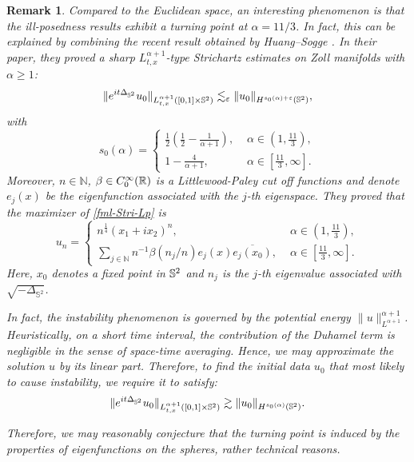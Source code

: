 \documentclass[10pt,a4paper]{amsart}
\numberwithin{equation}{section}
\newcommand{\R}{\Bbb R}
\newtheorem{remark}[theorem]{Remark}
\begin{document}
\begin{remark}
Compared to the Euclidean space, an interesting phenomenon is that the ill-posedness results exhibit a turning point at $\alpha=11/3$. In fact, this can be explained by combining the recent result obtained by Huang–Sogge \cite{Huang}. In their paper, they proved a sharp $L^{\alpha+1}_{t,x}$-type Strichartz estimates on Zoll manifolds with $\alpha \ge 1$:
\begin{equation}\label{fml-Stri-Lp}
\|e^{it\Delta_{\Bbb S^2}}u_0\|_{L^{\alpha+1}_{t,x}([0,1]\times \Bbb S^2)} \lesssim_\varepsilon
\|u_0\|_{H^{s_0(\alpha)+\varepsilon}(\Bbb S^2)},
\end{equation}
with
\begin{equation*}
s_0(\alpha)=\begin{cases}
\frac{1}{2}(\frac{1}{2}-\frac{1}{\alpha+1}),\,\, &\alpha\in(1,\frac{11}{3}),\\
1-\frac{4}{\alpha+1},\,\, &\alpha\in[\frac{11}{3},\infty].
\end{cases}
\end{equation*}
Moreover, $n\in \mathbb{N}$, $\beta\in C^\infty_0(\R)$ is a Littlewood-Paley cut off functions and denote $e_j(x)$ be the eigenfunction associated with the $j$-th eigenspace. They proved that the maximizer of \eqref{fml-Stri-Lp} is
\begin{equation*}
u_n=\begin{cases}
n^{\frac{1}{4}}(x_1+ix_2)^n,\,\, &\alpha\in(1,\frac{11}{3}),\\
\sum\limits_{j\in\mathbb{N}}n^{-1}\beta(n_j/n)e_j(x)\overline{e_j(x_0)},\,\,&\alpha\in[\frac{11}3{,\infty}].
\end{cases}
\end{equation*}
Here, $x_0$ denotes a fixed point in $\Bbb S^2$ and $n_j$ is the $j$-th eigenvalue associated with $\sqrt{-\Delta_{\mathbb S^2}}$.
		
In fact, the instability phenomenon is governed by the  potential energy $\|u\|^{\alpha+1}_{L^{\alpha+1}}$. Heuristically, on a short time interval,  the contribution of the Duhamel term is negligible in the sense of space-time averaging. Hence, we may approximate the solution 
$u$ by its linear part.
 Therefore, to find the initial data $u_0$ that most likely to cause instability, we require it to satisfy:
\begin{equation*}
\|e^{it\Delta_{\Bbb S^2}}u_0\|_{L^{\alpha+1}_{t,x}([0,1]\times \Bbb S^2)} \gtrsim \|u_0\|_{H^{s_0(\alpha)}(\Bbb S^2)}.
\end{equation*}
		
Therefore, we may reasonably conjecture that the turning point is induced by the properties of eigenfunctions on the spheres, rather technical reasons.
		
\end{remark}
	
\end{document}
